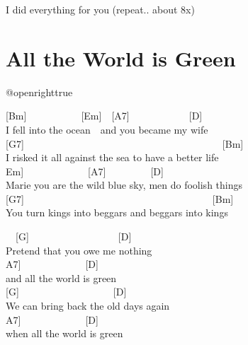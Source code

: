 \documentclass[
  letterpaper,
]{scrbook}
\begin{document}
I did everything for you (repeat.. about 8x)

\hypertarget{all-the-world-is-green}{%
\chapter{All the World is Green}\label{all-the-world-is-green}}

\csname @openrighttrue\endcsname

{[}Bm{]}~~~~~~~~~~~{[}Em{]}~~{[}A7{]}~~~~~~~~~~~~{[}D{]}\\
I fell into the ocean~~and you became my wife\\
{[}G7{]}~~~~~~~~~~~~~~~~~~~~~~~~~~~~~~~~~~~~~~~~{[}Bm{]}\\
I risked it all against the sea to have a better life\\
\hspace*{0.333em}\hspace*{0.333em}\hspace*{0.333em}\hspace*{0.333em}\hspace*{0.333em}\hspace*{0.333em}\hspace*{0.333em}\hspace*{0.333em}\hspace*{0.333em}\hspace*{0.333em}{[}Em{]}~~~~~~~~~~~~~{[}A7{]}~~~~~~~~~{[}D{]}\\
Marie you are the wild blue sky, men do foolish things\\
{[}G7{]}~~~~~~~~~~~~~~~~~~~~~~~~~~~~~~~~~~~~~~{[}Bm{]}\\
You turn kings into beggars and beggars into kings

~~{[}G{]}~~~~~~~~~~~~~~~~~~{[}D{]}\\
Pretend that you owe me nothing~~~~~~\\
\hspace*{0.333em}\hspace*{0.333em}\hspace*{0.333em}{[}A7{]}~~~~~~~~~~~~~{[}D{]}\\
and all the world is green\\
{[}G{]}~~~~~~~~~~~~~~~~~~~{[}D{]}~~~~~~~~\\
We can bring back the old days again~~~~~\\
\hspace*{0.333em}\hspace*{0.333em}\hspace*{0.333em}\hspace*{0.333em}{[}A7{]}~~~~~~~~~~~~~{[}D{]}\\
when all the world is green
\end{document}
